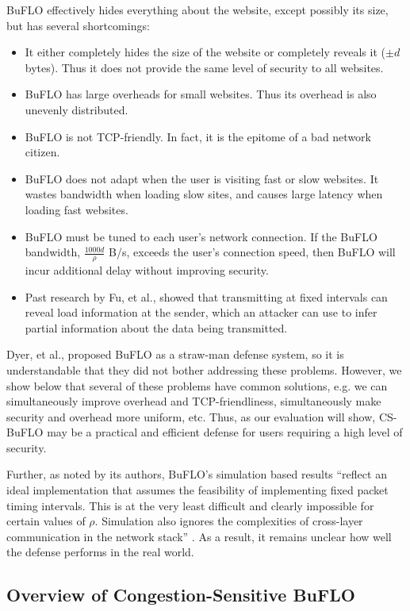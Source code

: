 \documentclass[10pt,journal]{IEEEtran}
\newcommand{\buflo} {BuFLO\xspace}
\newcommand{\csbuflo} {Congestion-Sensitive BuFLO\xspace}
\newcommand{\csb} {CS-BuFLO\xspace}
\begin{document}
\buflo effectively hides everything about the website, except possibly
its size, but has several shortcomings:
\begin{itemize}
  \item It either completely hides the size of the website or
    completely reveals it ($\pm d$ bytes).  Thus it does not provide
    the same level of security to all websites.
  \item \buflo has large overheads for small websites.  Thus its
    overhead is also unevenly distributed.
  \item \buflo is not TCP-friendly.  In fact, it is the epitome of a
    bad network citizen.
  \item \buflo does not adapt when the user is visiting fast or slow
    websites.  It wastes bandwidth when loading slow sites,
    and causes large latency when loading fast websites.
  \item \buflo must be tuned to each user's network connection.  If
    the \buflo bandwidth, $\frac{1000d}{\rho}$ B/s, exceeds the user's
    connection speed, then \buflo will incur additional delay without
    improving security.
  \item Past research by Fu, et al., showed that transmitting at fixed
    intervals can reveal load information at the sender, which an
    attacker can use to infer partial information about the data being
    transmitted\cite{fu-iaw03}.
\end{itemize}
Dyer, et al., proposed \buflo as a straw-man defense system, so it is
understandable that they did not bother addressing these problems.
However, we show below that several of these problems have common
solutions, e.g. we can simultaneously improve overhead and
TCP-friendliness, simultaneously make security and overhead more
uniform, etc.  Thus, as our evaluation will show, \csb may be a
practical and efficient defense for users requiring a high level of
security.

Further, as noted by its authors, \buflo's simulation based results
``reflect an ideal implementation that assumes the feasibility of
implementing fixed packet timing intervals. This is at the very
least difficult and clearly impossible for certain values of $\rho$.
Simulation also ignores the complexities of cross-layer communication 
in the network stack'' \cite{dyer-snp12}. As a result, it remains 
unclear how well the defense performs in the real world.


\subsection{Overview of \csbuflo}
\end{document}
